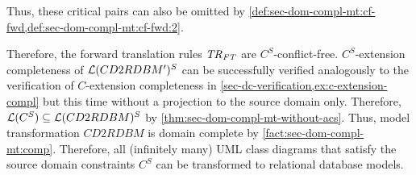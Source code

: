 \begin{example}
\begin{enumerate}
  Thus, these critical pairs can also be omitted by \cref{def:sec-dom-compl-mt:cf-fwd,def:sec-dom-compl-mt:cf-fwd:2}.
\end{enumerate}
Therefore, the forward translation rules $\mathit{TR}_\mathit{FT}$ are $C^S$-conflict-free.
$C^S$-extension completeness of $\mathcal{L}(CD2RDBM')^S$ can be successfully verified analogously to the verification of $C$-extension completeness in \cref{sec-dc-verification,ex:c-extension-compl} but this time without a projection to the source domain only. 
Therefore, $\mathcal{L}(C^S) \subseteq \mathcal{L}(CD2RDBM)^S$ by \cref{thm:sec-dom-compl-mt-without-acs}.
Thus, model transformation $CD2RDBM$ is domain complete by \cref{fact:sec-dom-compl-mt:comp}.
Therefore, all (infinitely many) UML class diagrams that satisfy the source domain constraints $C^S$ can be transformed to relational database models.
\envEndMarker
\end{example}